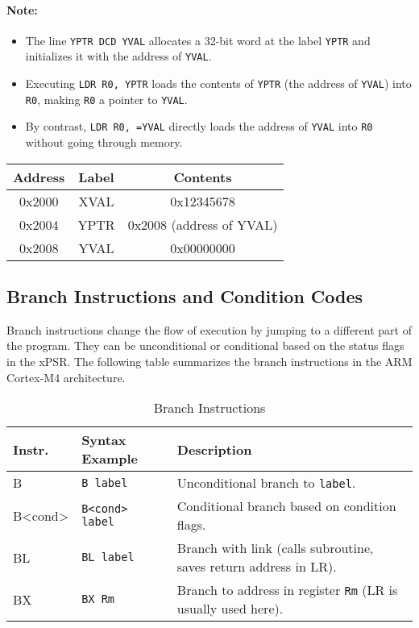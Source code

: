 \paragraph{Note:}  
\begin{itemize}[nosep]
    \item The line \texttt{YPTR DCD YVAL} allocates a 32-bit word at the label \texttt{YPTR} and initializes it with the address of \texttt{YVAL}.  
    \item Executing \texttt{LDR R0, YPTR} loads the contents of \texttt{YPTR} (the address of \texttt{YVAL}) into \texttt{R0}, making \texttt{R0} a pointer to \texttt{YVAL}.  
    \item By contrast, \texttt{LDR R0, =YVAL} directly loads the address of \texttt{YVAL} into \texttt{R0} without going through memory.  
\end{itemize}

\begin{center}
\begin{tabular}{|c|c|c|}
\hline
Address & Label & Contents \\
\hline
0x2000 & XVAL & 0x12345678 \\
0x2004 & YPTR & 0x2008 (address of YVAL) \\
0x2008 & YVAL & 0x00000000 \\
\hline
\end{tabular}
\end{center}

\subsection{Branch Instructions and Condition Codes}
Branch instructions change the flow of execution by jumping to a different part of the program. They can be unconditional or conditional based on the status flags in the xPSR. The following table summarizes the branch instructions in the ARM Cortex-M4 architecture.
\begin{table}[H]
\centering
\caption{Branch Instructions}
\small
\begin{tabularx}{\linewidth}{@{}l l X@{}}
\toprule
\textbf{Instr.} & \textbf{Syntax Example} & \textbf{Description} \\
\midrule
B    & \texttt{B label} & Unconditional branch to \texttt{label}. \\
B<cond> & \texttt{B<cond> label} & Conditional branch based on condition flags. \\
BL   & \texttt{BL label} & Branch with link (calls subroutine, saves return address in LR). \\
BX   & \texttt{BX Rm} & Branch to address in register \texttt{Rm} (LR is usually used here). \\
\bottomrule
\end{tabularx}
\vspace{2pt}
\end{table}

